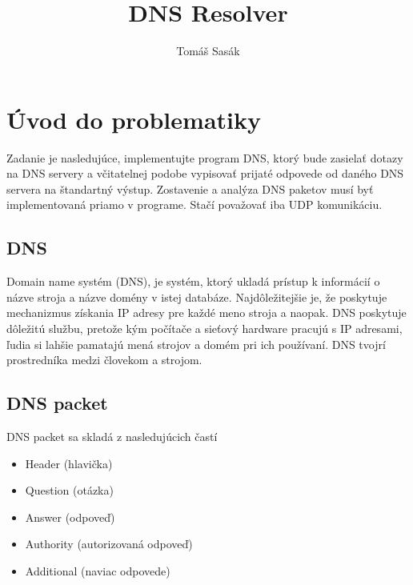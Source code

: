 \documentclass[titlepage]{article}
\begin{document}
\title{DNS Resolver}
\author{Tomáš Sasák}
\maketitle

\tableofcontents
\newpage

\section{Úvod do problematiky}
Zadanie je nasledujúce, implementujte program DNS, ktorý bude zasielať
dotazy na DNS servery a včitatelnej podobe vypisovať prijaté odpovede
od daného DNS servera na štandartný výstup. Zostavenie a analýza DNS paketov
musí byť implementovaná priamo v programe. Stačí považovať iba UDP komunikáciu.

\subsection{DNS}
Domain name systém (DNS), je systém, ktorý ukladá prístup k informácií o názve
stroja a názve domény v istej databáze. Najdôležitejšie je, že poskytuje mechanizmus
získania IP adresy pre každé meno stroja a naopak. DNS poskytuje dôležitú službu, pretože
kým počítače a sieťový hardware pracujú s IP adresami, ľudia si lahšie pamatajú mená
strojov a domém pri ich používaní. DNS tvojrí prostredníka medzi človekom a strojom.

\subsection{DNS packet}
DNS packet sa skladá z nasledujúcich častí
\begin{itemize}
    \item Header (hlavička)
    \item Question (otázka)
    \item Answer (odpoveď)
    \item Authority (autorizovaná odpoveď)
    \item Additional (naviac odpovede)
\end{itemize}
\end{document}
